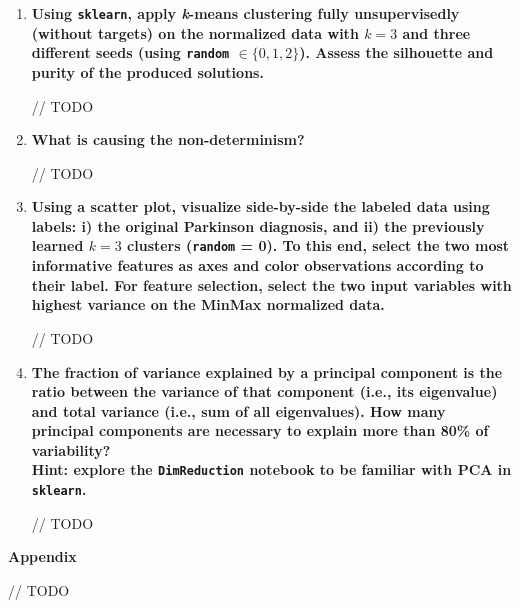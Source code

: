 \documentclass[12pt]{article}
\begin{document}
\begin{enumerate}[leftmargin=\labelsep]
    \item {\color{questioncolor}\bfseries
          Using \texttt{sklearn}, apply \textit{k}-means clustering fully unsupervisedly
          (without targets) on the normalized data with $k = 3$ and three different
          seeds (using \texttt{random} $\in \{0,1,2\}$).
          Assess the silhouette and purity of the produced solutions.
          }\\
          \vspace{0.5em}

          // TODO

    \item {\color{questioncolor}\bfseries
          What is causing the non-determinism?
          }\\
          \vspace{0.5em}

          // TODO

    \item {\color{questioncolor}\bfseries
          Using a scatter plot, visualize side-by-side the labeled data using labels:
          i) the original Parkinson diagnosis, and ii) the previously learned $k = 3$
          clusters (\texttt{random} = 0).
          To this end, select the two most informative features as axes and color
          observations according to their label.
          For feature selection, select the two input variables with highest
          variance on the MinMax normalized data.
          }\\
          \vspace{0.5em}

          // TODO

    \item {\color{questioncolor}\bfseries
          The fraction of variance explained by a principal component is the ratio
          between the variance of that component (i.e., its eigenvalue) and total
          variance (i.e., sum of all eigenvalues).
          How many principal components are necessary to explain more than 80\%
          of variability?\\
          Hint: explore the \texttt{DimReduction} notebook to be familiar
          with PCA in \texttt{sklearn}.
          }\\
          \vspace{0.5em}

          // TODO

\end{enumerate}

\pagebreak

\center\large{\textbf{Appendix}\vskip 0.3cm}

// TODO
\end{document}
